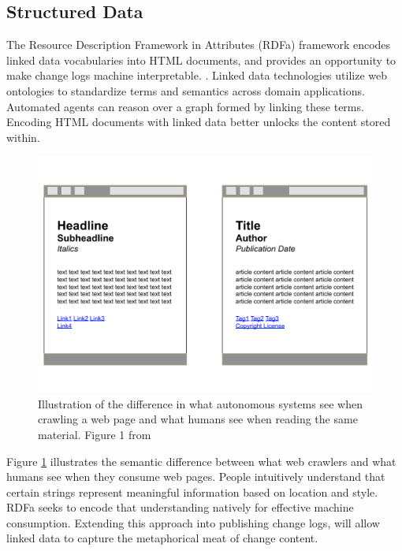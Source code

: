 \subsection{Structured Data}

The Resource Description Framework in Attributes (RDFa) framework encodes linked data vocabularies into HTML documents, and provides an opportunity to make change logs machine interpretable. \cite{Adida2015}.
Linked data technologies utilize web ontologies to standardize terms and semantics across domain applications.
Automated agents can reason over a graph formed by linking these terms.
Encoding HTML documents with linked data better unlocks the content stored within.
\begin{figure}
	\centering
	\includegraphics[scale=0.40]{figures/RDFaSemantics.png}
	\caption[Illustration of the difference in what autonomous systems see when crawling a web page and what humans see when reading the same material.]{Illustration of the difference in what autonomous systems see when crawling a web page and what humans see when reading the same material. Figure 1 from \cite{Herman2015}}
	\label{RDFa}
\end{figure}Figure \ref{RDFa} illustrates the semantic difference between what web crawlers and what humans see when they consume web pages.
People intuitively understand that certain strings represent meaningful information based on location and style.
RDFa seeks to encode that understanding natively for effective machine consumption.
Extending this approach into publishing change logs, will allow linked data to capture the metaphorical meat of change content.

